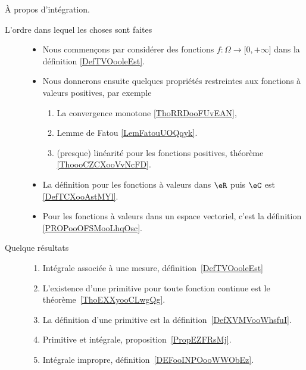 

     \label{THEMEooHINHooJaSYQW}

À propos d'intégration.
\begin{description}

	\item[L'ordre dans lequel les choses sont faites]
	      \begin{itemize}
		      \item
		            Nous commençons par considérer des fonctions \( f\colon \Omega\to \mathopen[ 0 , +\infty \mathclose]\) dans la définition \ref{DefTVOooleEst}.
		      \item
		            Nous donnerons ensuite quelques propriétés restreintes aux fonctions à valeurs positives, par exemple
		            \begin{enumerate}
			            \item
			                  La convergence monotone \ref{ThoRRDooFUvEAN},
			            \item
			                  Lemme de Fatou \ref{LemFatouUOQqyk}.
			            \item
			                  (presque) linéarité pour les fonctions positives, théorème \ref{ThoooCZCXooVvNcFD}.
		            \end{enumerate}
		      \item
		            La définition pour les fonctions à valeurs dans \( \eR\) puis \( \eC\) est \ref{DefTCXooAstMYl}.
		      \item
		            Pour les fonctions à valeurs dans un espace vectoriel, c'est la définition \ref{PROPooOFSMooLhqOsc}.
	      \end{itemize}
	\item[Quelque résultats]
	      \begin{enumerate}
		      \item
		            Intégrale associée à une mesure, définition~\ref{DefTVOooleEst}
		      \item
		            L'existence d'une primitive pour toute fonction continue est le théorème~\ref{ThoEXXyooCLwgQg}.
		      \item
		            La définition d'une primitive est la définition~\ref{DefXVMVooWhsfuI}.
		      \item
		            Primitive et intégrale, proposition~\ref{PropEZFRsMj}.
		      \item
		            Intégrale impropre, définition~\ref{DEFooINPOooWWObEz}.
	      \end{enumerate}

\end{description}
